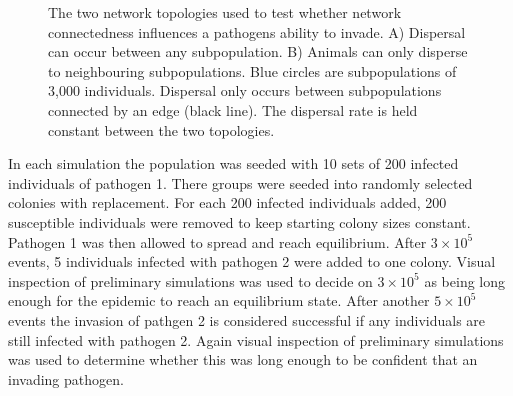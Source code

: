 \begin{figure}[t]
{\centering 
{}
}
\caption[Network topologies used to compare network connectedness]{
The two network topologies used to test whether network connectedness influences a pathogens ability to invade.
A) Dispersal can occur between any subpopulation.
B) Animals can only disperse to neighbouring subpopulations. 
Blue circles are subpopulations of 3,000 individuals.
Dispersal only occurs between subpopulations connected by an edge (black line).
The dispersal rate is held constant between the two topologies.
}
\label{f:net}
\end{figure}















In each simulation the population was seeded with 10 sets of 200 infected individuals of pathogen 1.
There groups were seeded into randomly selected colonies with replacement.
For each 200 infected individuals added, 200 susceptible individuals were removed to keep starting colony sizes constant. 
Pathogen 1 was then allowed to spread and reach equilibrium. 
After \ensuremath{3\times 10^{5}} events, 5 individuals infected with pathogen 2 were added to one colony. 
Visual inspection of preliminary simulations was used to decide on \ensuremath{3\times 10^{5}} as being long enough for the epidemic to reach an equilibrium state.
After another \ensuremath{5\times 10^{5}} events the invasion of pathgen 2 is considered successful if any individuals are still infected with pathogen 2.
Again visual inspection of preliminary simulations was used to determine whether this was long enough to be confident that an invading pathogen. 


